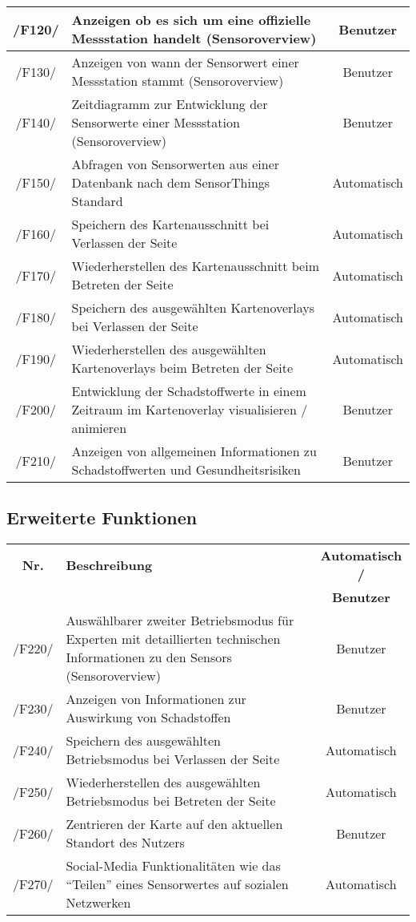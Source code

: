 \begin{tabularx}{\textwidth}{| c | X | c |}
        \hline
        /F120/ & Anzeigen ob es sich um eine offizielle Messstation handelt (\gls{Sensoroverview}) & Benutzer \\
        \hline
        /F130/ & Anzeigen von wann der Sensorwert einer Messstation stammt (\gls{Sensoroverview}) & Benutzer \\
        \hline
        /F140/ & Zeitdiagramm zur Entwicklung der Sensorwerte einer Messstation (\gls{Sensoroverview}) & Benutzer \\
        \hline
        /F150/ & Abfragen von Sensorwerten aus einer Datenbank nach dem SensorThings Standard & Automatisch \\
        \hline
        /F160/ & Speichern des Kartenausschnitt bei Verlassen der Seite & Automatisch \\
        \hline
        /F170/ & Wiederherstellen des Kartenausschnitt beim Betreten der Seite & Automatisch \\
        \hline
        /F180/ & Speichern des ausgewählten \glspl{Kartenoverlay} bei Verlassen der Seite & Automatisch \\
        \hline
        /F190/ & Wiederherstellen des ausgewählten \glspl{Kartenoverlay} beim Betreten der Seite & Automatisch \\
        \hline
        /F200/ & Entwicklung der Schadstoffwerte in einem Zeitraum im \gls{Kartenoverlay} visualisieren / animieren & Benutzer \\
        \hline
        /F210/ & Anzeigen von allgemeinen Informationen zu Schadstoffwerten und Gesundheitsrisiken & Benutzer \\
        \hline
\end{tabularx}
\subsection{Erweiterte Funktionen}
\begin{tabularx}{\textwidth}{| c | X | c |}
\hline
        \textbf{Nr.} & 
        \textbf{Beschreibung} & 
        \textbf{Automatisch /} \\
        & & \textbf{Benutzer} \\
        \hline
        /F220/ & Auswählbarer zweiter Betriebsmodus für Experten mit detaillierten technischen Informationen zu den \glspl{Sensor} (\gls{Sensoroverview}) & Benutzer \\
        \hline
        /F230/ & Anzeigen von Informationen zur Auswirkung von Schadstoffen & Benutzer \\
        \hline
        /F240/ & Speichern des ausgewählten Betriebsmodus bei Verlassen der Seite & Automatisch \\
        \hline
        /F250/ & Wiederherstellen des ausgewählten Betriebsmodus bei Betreten der Seite & Automatisch \\
        \hline
        /F260/ & Zentrieren der Karte auf den aktuellen Standort des Nutzers & Benutzer \\
        \hline
        /F270/ & Social-Media Funktionalitäten wie das \enquote{Teilen} eines Sensorwertes auf sozialen Netzwerken & Automatisch \\
        \hline
\end{tabularx}
